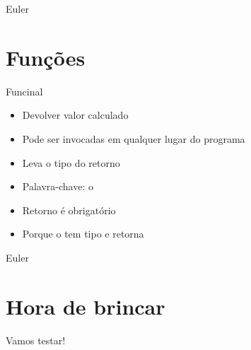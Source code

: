 \documentclass[14pt]{beamer}
\begin{document}
		\begin{frame}{Euler}
			\presentationPause
		\end{frame}


	\section{Funções}
		\begin{frame}{Funcinal}
			\begin{itemize}
				\presentationPause\item Devolver valor calculado
				\presentationPause\item Pode ser invocadas em qualquer lugar do programa
				\presentationPause\item Leva o tipo do retorno
				\presentationPause\item Palavra-chave: \presentationPause o 
				\presentationPause\item Retorno é obrigatório
				\presentationPause\item Porque o  tem tipo  e retorna 
			\end{itemize}
			\presentationPause
		\end{frame}

		\begin{frame}{Euler}
			\presentationPause
		\end{frame}


	\section{Hora de brincar}
		\begin{frame}
			\begin{center}\Huge
				Vamos testar!
			\end{center}
		\end{frame}
\end{document}
